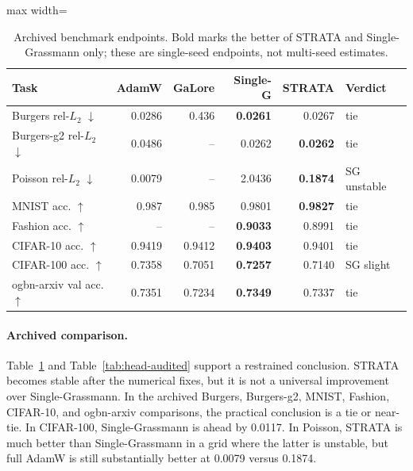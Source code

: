 \begin{table}[t]
\centering
\caption{Archived benchmark endpoints. Bold marks the better of STRATA and Single-Grassmann only; these are single-seed endpoints, not multi-seed estimates.}
\label{tab:main}
\footnotesize
\begin{adjustbox}{max width=\linewidth}
\begin{tabular}{lrrrrl}
\toprule
Task & AdamW & GaLore & Single-G & STRATA & Verdict \\
\midrule
Burgers rel-$L_2$ $\downarrow$ & 0.0286 & 0.436 & \textbf{0.0261} & \cellcolor{oursbg}0.0267 & tie \\
Burgers-g2 rel-$L_2$ $\downarrow$ & 0.0486 & -- & 0.0262 & \cellcolor{oursbg}\textbf{0.0262} & tie \\
Poisson rel-$L_2$ $\downarrow$ & 0.0079 & -- & 2.0436 & \cellcolor{oursbg}\textbf{0.1874} & SG unstable \\
MNIST acc. $\uparrow$ & 0.987 & 0.985 & 0.9801 & \cellcolor{oursbg}\textbf{0.9827} & tie \\
Fashion acc. $\uparrow$ & -- & -- & \textbf{0.9033} & \cellcolor{oursbg}0.8991 & tie \\
CIFAR-10 acc. $\uparrow$ & 0.9419 & 0.9412 & \textbf{0.9403} & \cellcolor{oursbg}0.9401 & tie \\
CIFAR-100 acc. $\uparrow$ & 0.7358 & 0.7051 & \textbf{0.7257} & \cellcolor{oursbg}0.7140 & SG slight \\
ogbn-arxiv val acc. $\uparrow$ & 0.7351 & 0.7234 & \textbf{0.7349} & \cellcolor{oursbg}0.7337 & tie \\
\bottomrule
\end{tabular}
\end{adjustbox}
\end{table}

\paragraph{Archived comparison.} Table~\ref{tab:main} and Table~\ref{tab:head-audited} support a restrained conclusion. STRATA becomes stable after the numerical fixes, but it is not a universal improvement over Single-Grassmann. In the archived Burgers, Burgers-g2, MNIST, Fashion, CIFAR-10, and ogbn-arxiv comparisons, the practical conclusion is a tie or near-tie. In CIFAR-100, Single-Grassmann is ahead by 0.0117. In Poisson, STRATA is much better than Single-Grassmann in a grid where the latter is unstable, but full AdamW is still substantially better at 0.0079 versus 0.1874.

